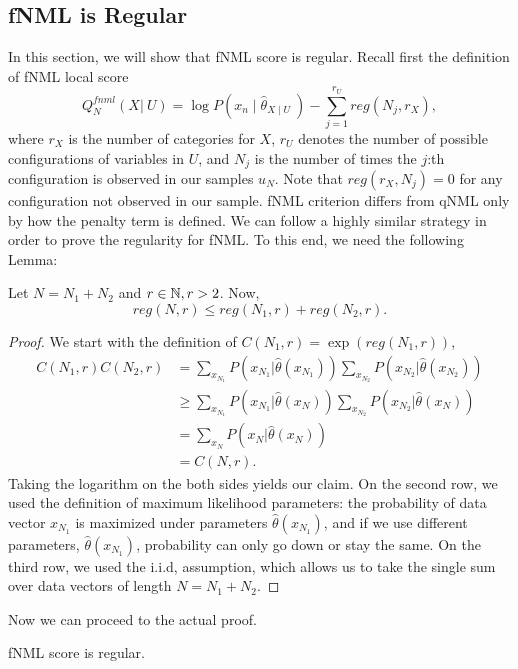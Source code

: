 \subsection{fNML is Regular}
In this section, we will show that fNML score is regular. Recall first the definition of fNML local score
\begin{equation}
Q^{fnml}_N(X  \vert \ U) = \log P(x_n \mid \hat{\theta}_{X\mid U} \ ) - \sum_{j = 1}^{r_U} reg(N_j,r_X),
\end{equation}where $r_X$ is the number of categories for $X$, $r_U$ denotes the number of possible configurations of variables in $U$, and $N_j$ is the number of times the $j$:th configuration is observed in our samples $u_N$. Note that $reg(r_X, N_j) = 0$ for any configuration not observed in our sample. 
fNML criterion differs from qNML only by how the penalty term is defined. We can follow a highly similar strategy in order to prove the regularity for fNML. To this end, we need the following Lemma:
\begin{lemma}\label{regineq}
Let $N = N_1 + N_2$ and $r \in\mathbb{N}, r > 2$. Now,
$$
reg(N,r) \leq reg(N_1,r) + reg(N_2,r).
$$
\end{lemma}
\begin{proof}
We start with the definition of $C(N_1,r) = \exp(reg(N_1,r))$,
\begin{align*}
C(N_1,r)C(N_2,r) &= \sum_{x_{N_1}}P(x_{N_1} \vert \hat{\theta}(x_{N_1} ))\sum_{x_{N_2}}P(x_{N_2} \vert \hat{\theta}(x_{N_2} ))\\ & \geq
\sum_{x_{N_1}}P(x_{N_1} \vert \hat{\theta}(x_{N} ))\sum_{x_{N_2}}P(x_{N_2} \vert \hat{\theta}(x_{N} )) \\ &=
\sum_{x_{N}}P(x_{N} \vert \hat{\theta}(x_{N} )) \\ & = C(N,r).
\end{align*}Taking the logarithm on the both sides yields our claim. On the second row, we used the definition of maximum likelihood parameters: the probability of data vector $x_{N_1}$ is maximized under parameters $\hat{\theta}(x_{N_1})$, and if we use different parameters, $\hat{\theta}(x_{N_1})$, probability can only go down or stay the same. On the third row, we used the i.i.d, assumption, which allows us to take the single sum over data vectors of length $N = N_1 + N_2$.     
\end{proof}
Now we can proceed to the actual proof.
\begin{theorem}
fNML score is regular.
\end{theorem}
